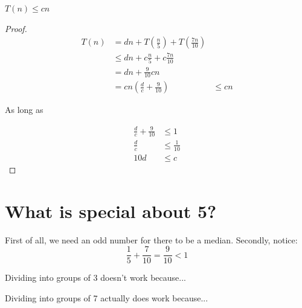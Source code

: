 \begin{claim}
$ T(n) \leq cn $
\end{claim}

\begin{proof}
\begin{align*}
T(n)
&= dn + T \left( \frac{n}{5} \right) +T \left( \frac{7n}{10} \right) \\
&\leq dn + c \frac{n}{5} + c \frac{7n}{10} \\
&= dn + \frac{9}{10}cn \\
&= cn \left( \frac{d}{c} + \frac{9}{10} \right)
&\leq cn
\end{align*}

As long as

\begin{align*}
\frac{d}{c} + \frac{9}{10} &\leq 1 \\
\frac{d}{c} &\leq \frac{1}{10} \\
10 d &\leq c
\end{align*}
\end{proof}

\section{What is special about 5?}

First of all, we need an odd number for there to be a median.
Secondly, notice:
%
\begin{displaymath}
\frac{1}{5} + \frac{7}{10} = \frac{9}{10} < 1
\end{displaymath}

Dividing into groups of 3 doesn't work because...

Dividing into groups of 7 actually does work because...
